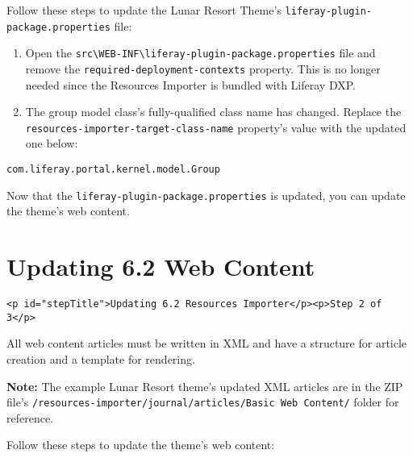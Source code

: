 Follow these steps to update the Lunar Resort Theme's
\texttt{liferay-plugin-package.properties} file:

\begin{enumerate}
\def\labelenumi{\arabic{enumi}.}
\item
  Open the
  \texttt{src\textbackslash{}WEB-INF\textbackslash{}liferay-plugin-package.properties}
  file and remove the \texttt{required-deployment-contexts} property.
  This is no longer needed since the Resources Importer is bundled with
  Liferay DXP.
\item
  The group model class's fully-qualified class name has changed.
  Replace the \texttt{resources-importer-target-class-name} property's
  value with the updated one below:
\end{enumerate}

\begin{verbatim}
com.liferay.portal.kernel.model.Group
\end{verbatim}

Now that the \texttt{liferay-plugin-package.properties} is updated, you
can update the theme's web content.

\chapter{Updating 6.2 Web Content}\label{updating-6.2-web-content}

\begin{verbatim}
<p id="stepTitle">Updating 6.2 Resources Importer</p><p>Step 2 of 3</p>
\end{verbatim}

All web content articles must be written in XML and have a structure for
article creation and a template for rendering.

\noindent\hrulefill

\textbf{Note:} The example Lunar Resort theme's updated XML articles are
in the ZIP file's
\texttt{/resources-importer/journal/articles/Basic\ Web\ Content/}
folder for reference.

\noindent\hrulefill

Follow these steps to update the theme's web content:

